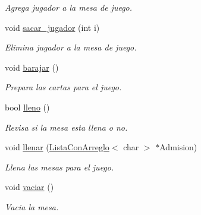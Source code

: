 \begin{DoxyCompactItemize}
\begin{DoxyCompactList}\small\item\em Agrega jugador a la mesa de juego. \end{DoxyCompactList}\item 
void \hyperlink{class_mesa_a6b366909106ac813211e0e36703dc1b1}{sacar\+\_\+jugador} (int i)
\begin{DoxyCompactList}\small\item\em Elimina jugador a la mesa de juego. \end{DoxyCompactList}\item 
\hypertarget{class_mesa_a35761c94c89ffcd57873b981428391db}{}\label{class_mesa_a35761c94c89ffcd57873b981428391db} 
void \hyperlink{class_mesa_a35761c94c89ffcd57873b981428391db}{barajar} ()
\begin{DoxyCompactList}\small\item\em Prepara las cartas para el juego. \end{DoxyCompactList}\item 
\hypertarget{class_mesa_a67c92e9165893fcdb496f37fae7fe30c}{}\label{class_mesa_a67c92e9165893fcdb496f37fae7fe30c} 
bool \hyperlink{class_mesa_a67c92e9165893fcdb496f37fae7fe30c}{lleno} ()
\begin{DoxyCompactList}\small\item\em Revisa si la mesa esta llena o no. \end{DoxyCompactList}\item 
void \hyperlink{class_mesa_a1aafcc25c473a282495a4c7043fb42de}{llenar} (\hyperlink{class_lista_con_arreglo}{Lista\+Con\+Arreglo}$<$ char $>$ $\ast$Admision)
\begin{DoxyCompactList}\small\item\em Llena las mesas para el juego. \end{DoxyCompactList}\item 
\hypertarget{class_mesa_ac7098158c1fcdf3846494d65b5ff6f06}{}\label{class_mesa_ac7098158c1fcdf3846494d65b5ff6f06} 
void \hyperlink{class_mesa_ac7098158c1fcdf3846494d65b5ff6f06}{vaciar} ()
\begin{DoxyCompactList}\small\item\em Vacia la mesa. \end{DoxyCompactList}\end{DoxyCompactItemize}
